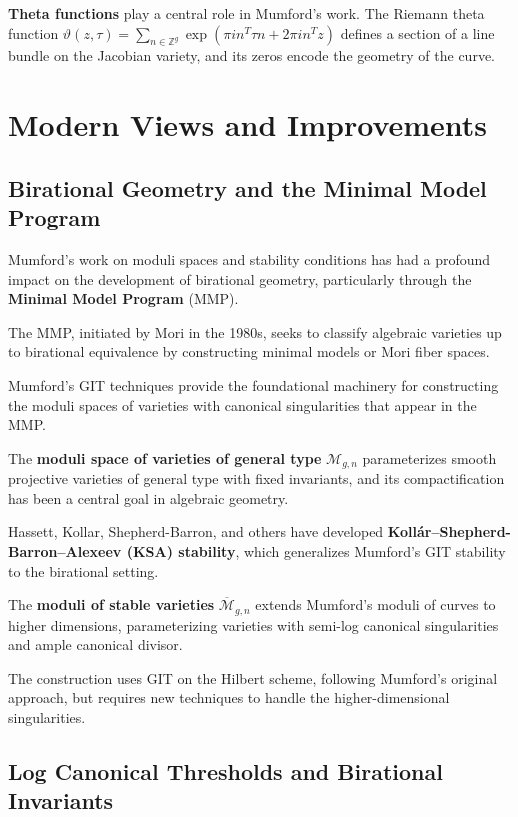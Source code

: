 \textbf{Theta functions} play a central role in Mumford's work. The Riemann theta function $\vartheta(z, \tau) = \sum_{n \in \mathbb{Z}^g} \exp(\pi i n^T \tau n + 2\pi i n^T z)$ defines a section of a line bundle on the Jacobian variety, and its zeros encode the geometry of the curve.

\section{Modern Views and Improvements}

\subsection{Birational Geometry and the Minimal Model Program}

Mumford's work on moduli spaces and stability conditions has had a profound impact on the development of birational geometry, particularly through the \textbf{Minimal Model Program} (MMP).

The MMP, initiated by Mori in the 1980s, seeks to classify algebraic varieties up to birational equivalence by constructing minimal models or Mori fiber spaces.

Mumford's GIT techniques provide the foundational machinery for constructing the moduli spaces of varieties with canonical singularities that appear in the MMP.

The \textbf{moduli space of varieties of general type} $\mathcal{M}_{g,n}$ parameterizes smooth projective varieties of general type with fixed invariants, and its compactification has been a central goal in algebraic geometry.

Hassett, Kollar, Shepherd-Barron, and others have developed \textbf{Kollár--Shepherd-Barron--Alexeev (KSA) stability}, which generalizes Mumford's GIT stability to the birational setting.

The \textbf{moduli of stable varieties} $\overline{\mathcal{M}}_{g,n}$ extends Mumford's moduli of curves to higher dimensions, parameterizing varieties with semi-log canonical singularities and ample canonical divisor.

The construction uses GIT on the Hilbert scheme, following Mumford's original approach, but requires new techniques to handle the higher-dimensional singularities.

\subsection{Log Canonical Thresholds and Birational Invariants}

